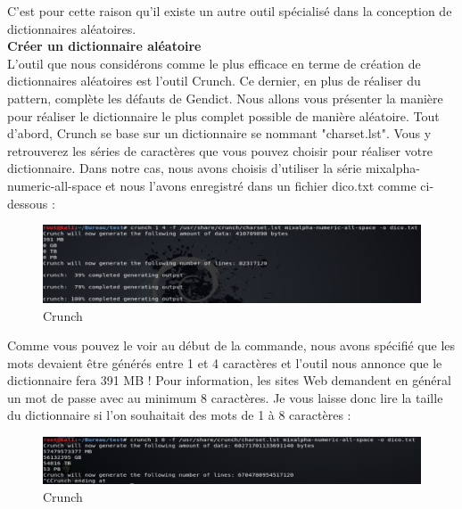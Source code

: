 C'est pour cette raison qu'il existe un autre outil spécialisé dans la conception de dictionnaires aléatoires.\\

 \textbf{Créer un dictionnaire aléatoire}\\

L'outil que nous considérons comme le plus efficace en terme de création de dictionnaires aléatoires est l'outil Crunch. Ce dernier, en plus de réaliser du pattern, complète les défauts de Gendict. Nous allons vous présenter la manière pour réaliser le dictionnaire le plus complet possible de manière aléatoire. Tout d'abord, Crunch se base sur un dictionnaire se nommant "charset.lst". Vous y retrouverez les séries de caractères que vous pouvez choisir pour réaliser votre dictionnaire. Dans notre cas, nous avons choisis d'utiliser la série mixalpha-numeric-all-space et nous l'avons enregistré dans un fichier dico.txt comme ci-dessous :

\begin{figure}[htp!]
  \centering
  \setlength\figureheight{7cm}
  \setlength\figurewidth{9cm}
  \includegraphics[width=1\textwidth]{oui/images/Dirb/crunch.PNG}
  \caption{Crunch}
  \label{fig:courbe-tikz}
\end{figure}

Comme vous pouvez le voir au début de la commande, nous avons spécifié que les mots devaient être générés entre 1 et 4 caractères et l'outil nous annonce que le dictionnaire fera 391 MB ! Pour information, les sites Web demandent en général un mot de passe avec au minimum 8 caractères. Je vous laisse donc lire la taille du dictionnaire si l'on souhaitait des mots de 1 à  8 caractères :

\begin{figure}[htp!]
  \centering
  \setlength\figureheight{7cm}
  \setlength\figurewidth{9cm}
  \includegraphics[width=1\textwidth]{oui/images/Dirb/crunch2.PNG}
  \caption{Crunch}
  \label{fig:courbe-tikz}
\end{figure}

